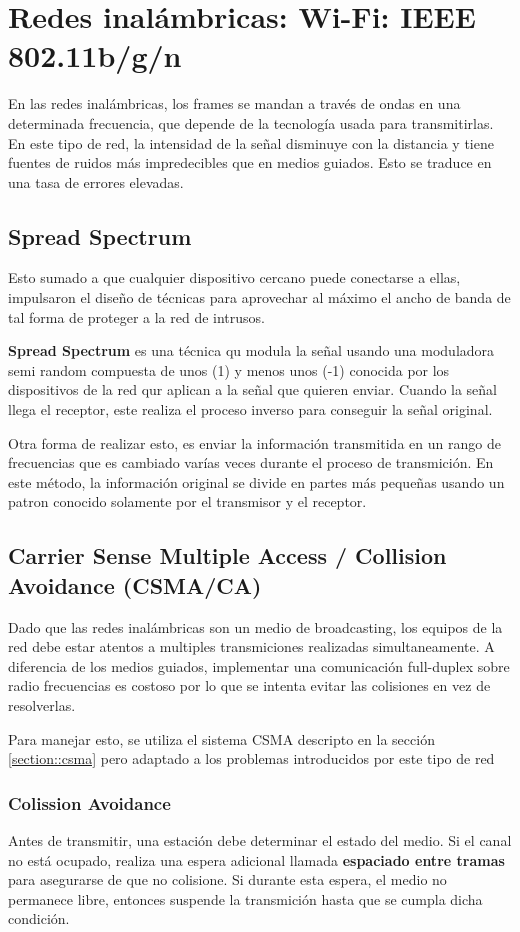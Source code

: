 \section{Redes inalámbricas: Wi-Fi: IEEE 802.11b/g/n}
En las redes inalámbricas, los frames se mandan a través de ondas en una determinada frecuencia, que depende de la tecnología usada para transmitirlas. En este tipo de red, la intensidad de la señal disminuye con la distancia y tiene fuentes de ruidos más impredecibles que en medios guiados. Esto se traduce en una tasa de errores elevadas.

\subsection{Spread Spectrum}
Esto sumado a que cualquier dispositivo cercano puede conectarse a ellas, impulsaron el diseño de técnicas para aprovechar al máximo el ancho de banda de tal forma de proteger a la red de intrusos.

\textbf{Spread Spectrum} es una técnica qu modula la señal usando una moduladora semi random compuesta de unos (1) y menos unos (-1) conocida por los dispositivos de la red qur aplican a la señal que quieren enviar. Cuando la señal llega el receptor, este realiza el proceso inverso para conseguir la señal original.

Otra forma de realizar esto, es enviar la información transmitida en un rango de frecuencias que es cambiado varías veces durante el proceso de transmición. En este método, la información original se divide en partes más pequeñas usando un patron conocido solamente por el transmisor y el receptor.

\subsection{Carrier Sense Multiple Access / Collision Avoidance (CSMA/CA)}

Dado que las redes inalámbricas son un medio de broadcasting, los equipos de la red debe estar atentos a multiples transmiciones realizadas simultaneamente. 
A diferencia de los medios guiados, implementar una comunicación full-duplex sobre radio frecuencias es costoso por lo que se intenta evitar las colisiones en vez de resolverlas.

Para manejar esto, se utiliza el sistema CSMA descripto en la sección \ref{section::csma} pero adaptado a los problemas introducidos por este tipo de red

\subsubsection{Colission Avoidance}
Antes de transmitir, una estación debe determinar el estado del medio. Si el canal no está ocupado, realiza una espera adicional llamada \textbf{espaciado entre tramas} para asegurarse de que no colisione.  Si durante esta espera, el medio no permanece libre, entonces suspende la transmición hasta que se cumpla dicha condición.

